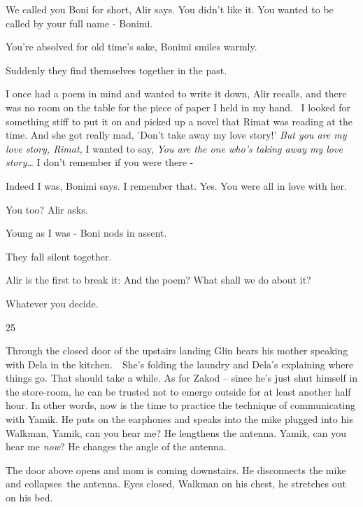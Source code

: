 \documentclass[twoside,11pt]{book}
\begin{document}
{\textquotedbl}We called you Boni for short,{\textquotedbl} Alir says. {\textquotedbl}You didn't like it. You wanted to
be called by your full name - Bonimi.{\textquotedbl}

{\textquotedbl}You're absolved for old time's sake,{\textquotedbl} Bonimi smiles warmly. 

Suddenly they find themselves together in the past. 

{\textquotedbl}I once had a poem in mind and wanted to write it down,{\textquotedbl} Alir recalls, {\textquotedbl}and
there was no room on the table for the piece of paper I held in my hand. ~I looked for something stiff to put it on and
picked up a novel that Rimat was reading at the time. And she got really mad, 'Don't take away my love story!'
\textit{But you are my love story, Rimat, }I wanted to say, \textit{You are the one who's taking away my love
story{\dots}} I don't remember if you were there -{\textquotedbl} 

{\textquotedbl}Indeed I was,{\textquotedbl} Bonimi says. {\textquotedbl}I remember that. Yes. You were all in love with
her.{\textquotedbl} 

{\textquotedbl}You too?{\textquotedbl} Alir asks. 

{\textquotedbl}Young as I was -{\textquotedbl} Boni nods in assent. 

They fall silent together.

Alir is the first to break it: {\textquotedbl}And the poem? What shall we do about it?{\textquotedbl} 

{\textquotedbl}Whatever you decide.{\textquotedbl}


\bigskip

25~~

Through the closed door of the upstairs landing Glin hears his mother speaking with Dela in the kitchen.\ \ She's
folding the laundry and Dela's explaining where things go. That should take a while. As for Zakod -- since he's just
shut himself in the store-room, he can be trusted not to emerge outside for at least another half hour. In other words,
now is the time to practice the technique of communicating with Yamik. He puts on the earphones and speaks into the
mike plugged into his Walkman, {\textquotedbl}Yamik, can you hear me?{\textquotedbl} He lengthens the antenna.
{\textquotedbl}Yamik, can you hear me \textit{now}?{\textquotedbl} He changes the angle of the antenna.

The door above opens and mom is coming downstairs. He disconnects the mike and collapses{\ }the antenna.
Eyes closed, Walkman on his chest, he stretches out on his bed.\ 
\end{document}
